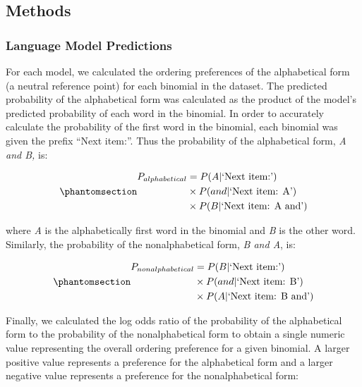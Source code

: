 \documentclass[
  nottoc]{article}
\begin{document}
\subsection{Methods}\label{methods}

\subsubsection{Language Model
Predictions}\label{language-model-predictions}

For each model, we calculated the ordering preferences of the
alphabetical form (a neutral reference point) for each binomial in the
dataset. The predicted probability of the alphabetical form was
calculated as the product of the model's predicted probability of each
word in the binomial. In order to accurately calculate the probability
of the first word in the binomial, each binomial was given the prefix
``Next item:''. Thus the probability of the alphabetical form, \emph{A
and B,} is:

\begin{equation}\phantomsection\label{eq-probalpha}{
\begin{aligned}
    P_{alphabetical} & = P(A|\text{`Next item:'} )\\      
    & \times P(and|\text{`Next item: A'})\\      
    & \times P(B|\text{`Next item: A and'})
\end{aligned}
}\end{equation}

\noindent where \emph{A} is the alphabetically first word in the
binomial and \emph{B} is the other word. Similarly, the probability of
the nonalphabetical form, \emph{B and A}, is:

\begin{equation}\phantomsection\label{eq-probnonalpha}{
\begin{aligned}    
P_{nonalphabetical} & = P(B|\text{`Next item:'})\\
& \times P(and|\text{`Next item: B'})\\
& \times P(A|\text{`Next item: B and'})
\end{aligned}
}\end{equation}

Finally, we calculated the log odds ratio of the probability of the
alphabetical form to the probability of the nonalphabetical form to
obtain a single numeric value representing the overall ordering
preference for a given binomial. A larger positive value represents a
preference for the alphabetical form and a larger negative value
represents a preference for the nonalphabetical form:
\end{document}
